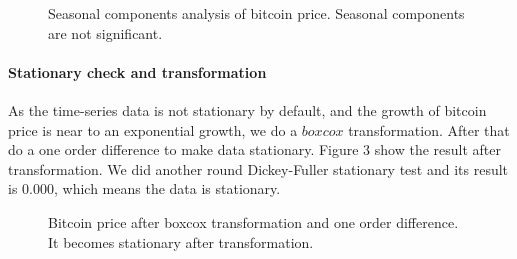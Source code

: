 \documentclass[10pt,twocolumn,letterpaper]{article}
\begin{document}
\begin{figure}[h]
\begin{center}
\end{center}
   \caption{Seasonal components analysis of bitcoin price. Seasonal components are not significant.}
\end{figure}

\paragraph{Stationary check and transformation}
As the time-series data is not stationary by default, and the growth of bitcoin price is near to an exponential growth, we do a $boxcox$ transformation. After that do a one order difference to make data stationary. Figure 3 show the result after transformation. We did another round Dickey-Fuller stationary test and its result is $0.000$, which means the data is stationary.

\begin{figure}[h]
\begin{center}
\end{center}
   \caption{Bitcoin price after boxcox transformation and one order difference. It becomes stationary after transformation.}
\end{figure}
\end{document}
